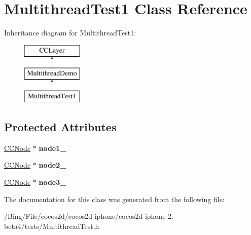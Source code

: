\hypertarget{interface_multithread_test1}{\section{Multithread\-Test1 Class Reference}
\label{interface_multithread_test1}
}
Inheritance diagram for Multithread\-Test1\-:\begin{figure}[H]
\begin{center}
\leavevmode
\includegraphics[height=3.000000cm]{interface_multithread_test1}
\end{center}
\end{figure}
\subsection*{Protected Attributes}
\begin{DoxyCompactItemize}
\item 
\hypertarget{interface_multithread_test1_acbc01e1d4e0893274de0501782ee3aed}{\hyperlink{class_c_c_node}{C\-C\-Node} $\ast$ {\bfseries node1\-\_\-}}\label{interface_multithread_test1_acbc01e1d4e0893274de0501782ee3aed}

\item 
\hypertarget{interface_multithread_test1_ab4494cec52dd5273c3db251490b20555}{\hyperlink{class_c_c_node}{C\-C\-Node} $\ast$ {\bfseries node2\-\_\-}}\label{interface_multithread_test1_ab4494cec52dd5273c3db251490b20555}

\item 
\hypertarget{interface_multithread_test1_a5d9ef7eee0a1ff13a2c7cd97dd95e455}{\hyperlink{class_c_c_node}{C\-C\-Node} $\ast$ {\bfseries node3\-\_\-}}\label{interface_multithread_test1_a5d9ef7eee0a1ff13a2c7cd97dd95e455}

\end{DoxyCompactItemize}


The documentation for this class was generated from the following file\-:\begin{DoxyCompactItemize}
\item 
/\-Bing/\-File/cocos2d/cocos2d-\/iphone/cocos2d-\/iphone-\/2.-\/beta4/tests/Multithread\-Test.\-h\end{DoxyCompactItemize}
